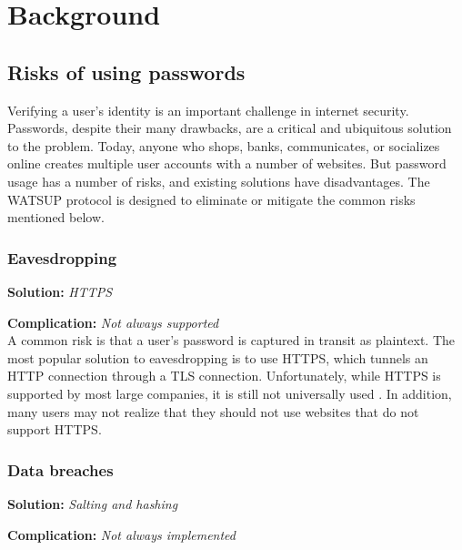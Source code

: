 \section{Background}
\label{sec:background}

\subsection{Risks of using passwords}

Verifying a user's identity is an important challenge in internet security. Passwords, despite their many drawbacks, are a critical and ubiquitous solution to the problem. Today, anyone who shops, banks, communicates, or socializes online creates multiple user accounts with a number of websites. But password usage has a number of risks, and existing solutions have disadvantages. The WATSUP protocol is designed to eliminate or mitigate the common risks mentioned below.


\subsubsection{Eavesdropping}

\textbf{Solution:} \emph{HTTPS}

\noindent\textbf{Complication:} \emph{Not always supported}\\

\noindent A common risk is that a user's password is captured in transit as plaintext. The most popular solution to eavesdropping is to use HTTPS, which tunnels an HTTP connection through a TLS connection. Unfortunately, while HTTPS is supported by most large companies, it is still not universally used \cite{Aas:2016}. In addition, many users may not realize that they should not use websites that do not support HTTPS.


\subsubsection{Data breaches}

\textbf{Solution:} \emph{Salting and hashing}

\noindent\textbf{Complication:} \emph{Not always implemented}\\

